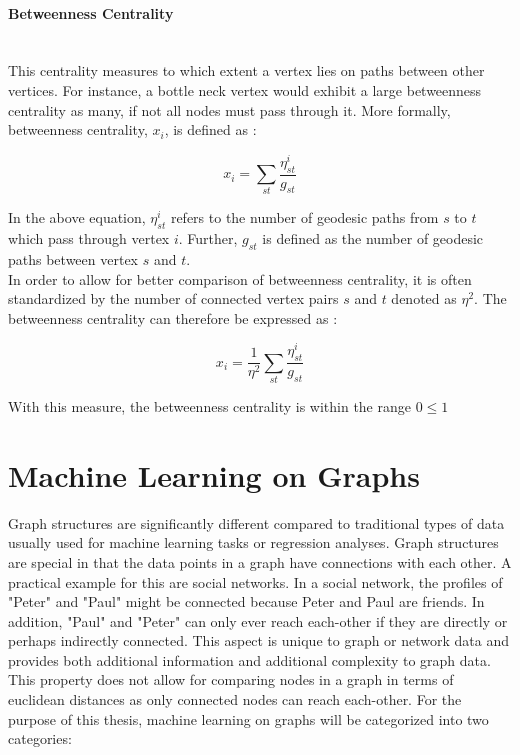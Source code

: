 	\paragraph{Betweenness Centrality} \mbox{}\\

	\noindent This centrality measures to which extent a vertex lies on paths 
	between other vertices. For instance, a bottle neck vertex would exhibit a 
	large betweenness centrality as many, if not all nodes must pass through it. 
	More formally, betweenness centrality, $x_i$, is defined as 
	\citep[p. 187]{Newman2010}:

	\begin{equation}
		x_i = \sum_{st} \frac{\eta_{st}^i}{g_{st}}
	\end{equation}

	\noindent In the above equation, $\eta_{st}^i$ refers to the number of 
	geodesic paths from $s$ to $t$ which pass through vertex $i$. Further,
	$g_{st}$ is defined as the number of geodesic paths between vertex $s$ and
	$t$. \\

	\noindent In order to allow for better comparison of betweenness
	centrality, it is often standardized by the number of connected vertex
	pairs $s$ and $t$ denoted as  $\eta^2$. The betweenness centrality
	can therefore be expressed as \citep[p.190]{Newman2010}:

	\begin{equation}
		x_i = \frac{1}{\eta^2}\sum_{st} \frac{\eta_{st}^i}{g_{st}}
	\end{equation}

	\noindent With this measure, the betweenness centrality is within the range
	$0\leqslant1$

	\section{Machine Learning on Graphs}

	\noindent Graph structures are significantly different compared to
	traditional types of data usually used for machine learning tasks or
	regression analyses. Graph structures are special in that the data points
	in a graph have connections with each other. A practical example for this
	are social networks. In a social network, the profiles of "Peter" and
	"Paul" might be connected because Peter and Paul are friends. In addition,
	"Paul" and "Peter" can only ever reach each-other if they are directly or
	perhaps indirectly connected. This aspect is unique to graph or network data 
	and provides both additional information and additional complexity to graph 
	data. This property does not allow for comparing nodes in a graph in terms
	of euclidean distances as only connected nodes can reach each-other. For
	the purpose of this thesis, machine learning on graphs will be categorized
	into two categories:

